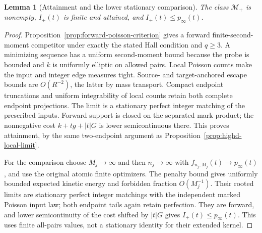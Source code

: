 \documentclass[11pt,reqno]{amsart}
\newtheorem{lemma}[theorem]{Lemma}
\theoremstyle{definition}
\theoremstyle{remark}
\numberwithin{equation}{section}
\begin{document}
\begin{lemma}[Attainment and the lower stationary comparison]
\label{forward-full-stationary-existence}
The class \(\mathcal M_+\) is nonempty, \(I_+(t)\) is finite and
attained, and \(I_+(t)\le p_\infty(t)\).
\end{lemma}
\begin{proof}
Proposition~\ref{prop:forward-poisson-criterion} gives a forward
finite-second-moment competitor under exactly the stated Hall condition
and \(q\ge3\). A minimizing sequence has a uniform second-moment
bound because the probe is bounded and \(k\) is uniformly elliptic on
allowed pairs. Local Poisson counts make the input and integer edge
measures tight. Source- and target-anchored escape bounds are \(O(R^{-2})\),
the latter by mass transport. Compact endpoint truncations and uniform
integrability of local counts retain both complete endpoint projections.
The limit is a stationary perfect integer matching of the prescribed
inputs. Forward support is closed on the separated mark product; the
nonnegative cost \(k+t g+|t|G\) is lower semicontinuous there. This
proves attainment, by the same two-endpoint argument as
Proposition~\ref{prop:highd-local-limit}.

For the comparison choose \(M_j\to\infty\) and then \(n_j\to\infty\)
with \(f_{n_j,M_j}(t)\to p_\infty(t)\), and use the original atomic
finite optimizers. The penalty bound gives uniformly bounded expected
kinetic energy and forbidden fraction \(O(M_j^{-1})\). Their rooted
limits are stationary perfect integer matchings with the independent
marked Poisson input law; both endpoint tails again retain perfection.
They are forward, and lower semicontinuity of the cost shifted by \(|t|G\)
gives \(I_+(t)\le p_\infty(t)\). This uses finite all-pairs values,
not a stationary identity for their extended kernel.
\end{proof}
\end{document}
